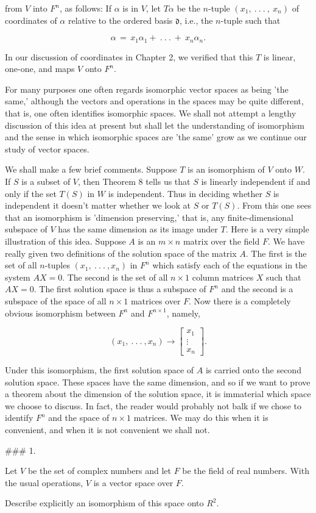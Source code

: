 from \(V\) into \(F^{n}\), as follows: If \(\alpha\) is in \(V\), let \(T\alpha\) be the \(n\)-tuple \((x_{1},\ .\ .\ .\ ,\ x_{n})\) of coordinates of \(\alpha\) relative to the ordered basis \(\mathfrak{d}\), i.e., the \(n\)-tuple such that

\[\alpha\,=\,x_{1}\alpha_{1}+\ .\ .\ .\ +\ x_{n}\alpha_{n}.\]

In our discussion of coordinates in Chapter 2, we verified that this \(T\) is linear, one-one, and maps \(V\) onto \(F^{n}\).

For many purposes one often regards isomorphic vector spaces as being 'the same,' although the vectors and operations in the spaces may be quite different, that is, one often identifies isomorphic spaces. We shall not attempt a lengthy discussion of this idea at present but shall let the understanding of isomorphism and the sense in which isomorphic spaces are 'the same' grow as we continue our study of vector spaces.

We shall make a few brief comments. Suppose \(T\) is an isomorphism of \(V\) onto \(W\). If \(S\) is a subset of \(V\), then Theorem 8 tells us that \(S\) is linearly independent if and only if the set \(T(S)\) in \(W\) is independent. Thus in deciding whether \(S\) is independent it doesn't matter whether we look at \(S\) or \(T(S)\). From this one sees that an isomorphism is 'dimension preserving,' that is, any finite-dimensional subspace of \(V\) has the same dimension as its image under \(T\). Here is a very simple illustration of this idea. Suppose \(A\) is an \(m\times n\) matrix over the field \(F\). We have really given two definitions of the solution space of the matrix \(A\). The first is the set of all \(n\)-tuples \((x_{1},\ .\ .\ .\ ,x_{n})\) in \(F^{n}\) which satisfy each of the equations in the system \(AX=0\). The second is the set of all \(n\times 1\) column matrices \(X\) such that \(AX=0\). The first solution space is thus a subspace of \(F^{n}\) and the second is a subspace of the space of all \(n\times 1\) matrices over \(F\). Now there is a completely obvious isomorphism between \(F^{n}\) and \(F^{n\times 1}\), namely,

\[(x_{1},\ .\ .\ .\ ,x_{n})\to\left[\begin{array}{c}x_{1}\\ \vdots\\ x_{n}\end{array}\right].\]

Under this isomorphism, the first solution space of \(A\) is carried onto the second solution space. These spaces have the same dimension, and so if we want to prove a theorem about the dimension of the solution space, it is immaterial which space we choose to discuss. In fact, the reader would probably not balk if we chose to identify \(F^{n}\) and the space of \(n\times 1\) matrices. We may do this when it is convenient, and when it is not convenient we shall not.

### 1.

Let \(V\) be the set of complex numbers and let \(F\) be the field of real numbers. With the usual operations, \(V\) is a vector space over \(F\).

Describe explicitly an isomorphism of this space onto \(R^{2}\).

 